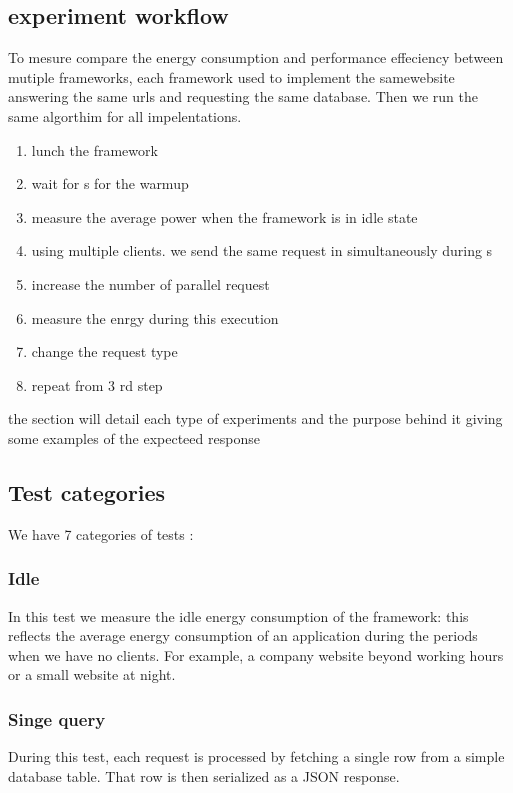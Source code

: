\subsection{experiment workflow}
To mesure compare the energy consumption and performance effeciency between mutiple frameworks, each framework used to implement the samewebsite answering the same urls and requesting the same database. Then we run the same algorthim for all impelentations.
\begin{enumerate}
    \item lunch the framework
    \item wait for \duration s for the warmup
    \item measure the average power when the framework is in idle state
    \item using multiple clients. we send the same request in simultaneously during \duration s
    \item increase the number of parallel request
    \item measure the enrgy during this execution
    \item change the request type
    \item repeat from 3 rd step
\end{enumerate}
the section will detail each type of experiments  and the purpose behind it giving some examples of the expecteed response

\subsection{Test categories }
We have 7 categories of tests :
\\ 
\subsubsection{Idle}
In this test we measure the idle energy consumption of the framework: this reflects the average energy consumption of an application during the periods when we have no clients.
For example, a company website beyond working hours or a small website at night. %

\subsubsection{Singe query}
During this test, each request is processed by fetching a single row from a simple database table. That row is then serialized as a JSON response.

